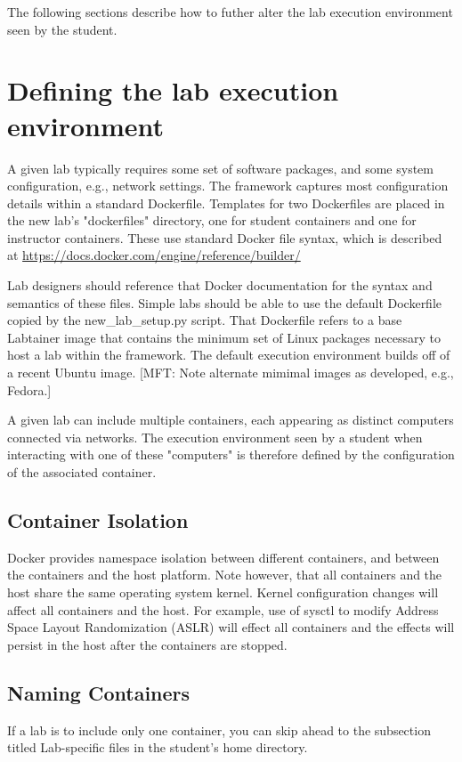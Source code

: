 \documentclass{article}
\begin{document}
The following sections describe how to futher alter the lab execution environment seen by 
the student.

\section {Defining the lab execution environment}
A given lab typically requires some set of software packages, and some
system configuration, e.g., network settings.  
The framework captures most configuration details within a standard
Dockerfile.  Templates for two Dockerfiles are placed in the new lab's "dockerfiles" 
directory, one for student containers and one for instructor containers.
These use standard Docker file syntax, which is described at 
\url{https://docs.docker.com/engine/reference/builder/}

Lab designers should reference that Docker documentation for the 
syntax and semantics of these files.
Simple labs should be able to use the default Dockerfile copied by the 
new\_lab\_setup.py script.  That Dockerfile refers to a base Labtainer
image that contains the minimum set of Linux packages necessary to 
host a lab within the framework.  The default
execution environment builds off of a recent Ubuntu image.
[MFT: Note alternate mimimal images as developed, e.g., Fedora.]

A given lab can include multiple containers, each appearing as distinct
computers connected via networks.  The execution environment seen by a
student when interacting with one of these "computers" is therefore defined
by the configuration of the associated container.  

\subsection {Container Isolation}
Docker provides namespace isolation between different containers, and
between the containers and the host platform.  Note however, that all
containers and the host share the same operating system kernel.  Kernel
configuration changes will affect all containers and the host.  For example,
use of sysctl to modify Address Space Layout Randomization (ASLR) will effect
all containers and the effects will persist in the host after the containers
are stopped.

\subsection {Naming Containers}
If a lab is to include only one container, you can
skip ahead to the subsection titled Lab-specific files in the student's home directory.
\end{document}
